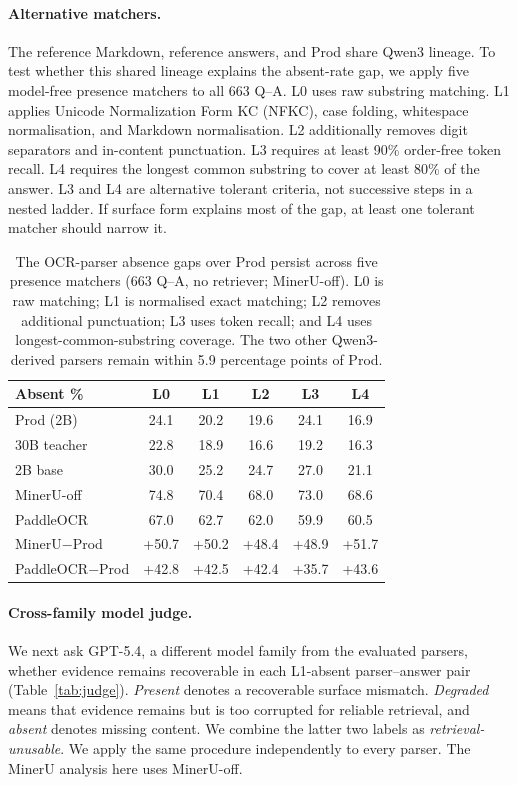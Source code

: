 \documentclass[11pt]{article}
\begin{document}
\paragraph{Alternative matchers.} The reference Markdown, reference answers, and Prod share Qwen3 lineage. To test whether this shared lineage explains the absent-rate gap, we apply five model-free presence matchers to all 663 Q--A. L0 uses raw substring matching. L1 applies Unicode Normalization Form KC (NFKC), case folding, whitespace normalisation, and Markdown normalisation. L2 additionally removes digit separators and in-content punctuation. L3 requires at least 90\% order-free token recall. L4 requires the longest common substring to cover at least 80\% of the answer. L3 and L4 are alternative tolerant criteria, not successive steps in a nested ladder. If surface form explains most of the gap, at least one tolerant matcher should narrow it.

\begin{table}[ht!]
\centering\footnotesize
\setlength{\tabcolsep}{1.5pt}
\begin{tabular}{lccccc}
\toprule
Absent \% & L0 & L1 & L2 & L3 & L4 \\
\midrule
Prod (2B) & 24.1 & 20.2 & 19.6 & 24.1 & 16.9 \\
30B teacher & 22.8 & 18.9 & 16.6 & 19.2 & 16.3 \\
2B base & 30.0 & 25.2 & 24.7 & 27.0 & 21.1 \\
MinerU-off & 74.8 & 70.4 & 68.0 & 73.0 & 68.6 \\
PaddleOCR & 67.0 & 62.7 & 62.0 & 59.9 & 60.5 \\
\midrule
MinerU$-$Prod & +50.7 & +50.2 & +48.4 & +48.9 & +51.7 \\
PaddleOCR$-$Prod & +42.8 & +42.5 & +42.4 & +35.7 & +43.6 \\
\bottomrule
\end{tabular}
\caption{The OCR-parser absence gaps over Prod persist across five presence matchers (663 Q--A, no retriever; MinerU-off). L0 is raw matching; L1 is normalised exact matching; L2 removes additional punctuation; L3 uses token recall; and L4 uses longest-common-substring coverage. The two other Qwen3-derived parsers remain within 5.9 percentage points of Prod.}
\label{tab:familyneutral}
\end{table}

\paragraph{Cross-family model judge.} We next ask GPT-5.4, a different model family from the evaluated parsers, whether evidence remains recoverable in each L1-absent parser--answer pair (Table~\ref{tab:judge}). \emph{Present} denotes a recoverable surface mismatch. \emph{Degraded} means that evidence remains but is too corrupted for reliable retrieval, and \emph{absent} denotes missing content. We combine the latter two labels as \emph{retrieval-unusable}. We apply the same procedure independently to every parser. The MinerU analysis here uses MinerU-off.
\end{document}
